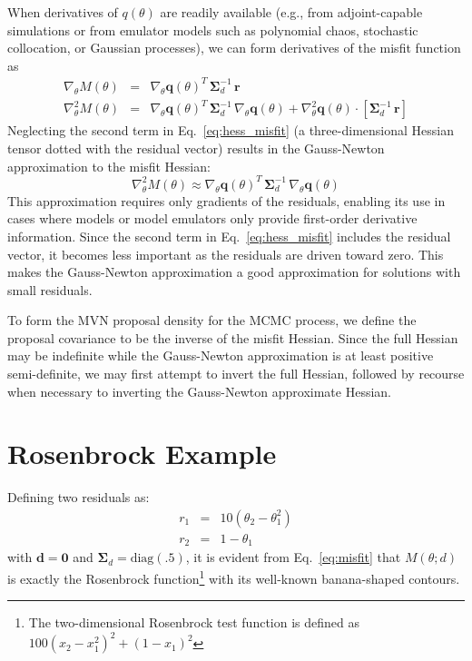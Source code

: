 When derivatives of $q(\theta)$ are readily available (e.g.,
from adjoint-capable simulations or from emulator models such as
polynomial chaos, stochastic collocation, or Gaussian processes), we
can form derivatives of the misfit function as
\begin{eqnarray}
\nabla_\theta M(\theta) &=& \nabla_\theta \boldsymbol{q}(\theta)^T\,\boldsymbol{\Sigma}_d^{-1}\,\boldsymbol{r} \label{eq:grad_misfit} \\
\nabla^2_\theta M(\theta) &=& \nabla_\theta \boldsymbol{q}(\theta)^T\,\boldsymbol{\Sigma}_d^{-1}\,\nabla_\theta \boldsymbol{q}(\theta) + \nabla^2_\theta \boldsymbol{q}(\theta) \cdot \left[\boldsymbol{\Sigma}_d^{-1}\,\boldsymbol{r}\right] \label{eq:hess_misfit}
\end{eqnarray}
Neglecting the second term in Eq.~\ref{eq:hess_misfit} (a
three-dimensional Hessian tensor dotted with the residual vector)
results in the Gauss-Newton approximation to the misfit Hessian:
\begin{equation}
\nabla^2_\theta M(\theta) \approx \nabla_\theta \boldsymbol{q}(\theta)^T\,\boldsymbol{\Sigma}_d^{-1}\,\nabla_\theta \boldsymbol{q}(\theta) \label{eq:hess_misfit_gn}
\end{equation}
This approximation requires only gradients of the residuals, enabling
its use in cases where models or model emulators only provide
first-order derivative information.  Since the second term in
Eq.~\ref{eq:hess_misfit} includes the residual vector, it becomes less
important as the residuals are driven toward zero.  This makes the
Gauss-Newton approximation a good approximation for solutions with
small residuals.

To form the MVN proposal density for the MCMC process, we define the
proposal covariance to be the inverse of the misfit Hessian.  Since
the full Hessian may be indefinite while the Gauss-Newton
approximation is at least positive semi-definite, we may first attempt
to invert the full Hessian, followed by recourse when necessary to
inverting the Gauss-Newton approximate Hessian.

\section{Rosenbrock Example} \label{uq:bayes:ex}

Defining two residuals as:
\begin{eqnarray}
r_1 &=& 10 (\theta_2 - \theta_1^2) \label{eq:rosen_r1} \\
r_2 &=& 1 - \theta_1 \label{eq:rosen_r2}
\end{eqnarray}
with $\boldsymbol{d} = \boldsymbol{0}$ and $\boldsymbol{\Sigma}_d =
\text{diag}(\boldsymbol{.5})$, it is evident from Eq.~\ref{eq:misfit}
that $M(\theta;d)$ is exactly the Rosenbrock function\footnote{The
  two-dimensional Rosenbrock test function is defined as $100 (x_2 -
  x_1^2)^2 + (1 - x_1)^2$} with its well-known banana-shaped contours.

